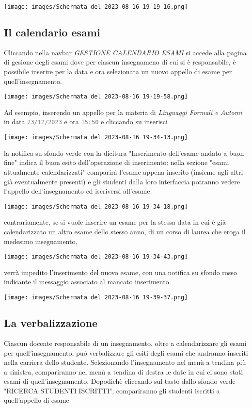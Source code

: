 \documentclass{article}
\newcommand{\attr}[1]{\texttt{\textcolor{gray}{#1}}}
\begin{document}
    \texttt{[image: images/Schermata del 2023-08-16 19-19-16.png]}

    \subsection{Il calendario esami}
    Cliccando nella navbar \textit{GESTIONE CALENDARIO ESAMI} si accede alla pagina di gesione degli esami dove per ciascun insegnameno di cui si è responsabile, è possibile inserire per la data e ora selezionata un nuovo appello di esame per quell'insegnamento.

    \texttt{[image: images/Schermata del 2023-08-16 19-19-58.png]}

    Ad esempio, inserendo un appello per la materia di \textit{Linguaggi Formali e Automi} in data \attr{23/12/2023} e ora \attr{15:50} e cliccando su inserisci

    \texttt{[image: images/Schermata del 2023-08-16 19-34-13.png]}

    la notifica su sfondo verde con la dicitura "Inserimento dell'esame andato a buon fine" indica il buon esito dell'operazione di inserimento: nella sezione "esami attualmente calendarizzati" comparirà l'esame appena inserito (insieme agli altri già eventualmente presenti) e gli studenti dalla loro interfaccia potranno vedere l'appello dell'insegnamento ed iscriversi all'esame.

    \texttt{[image: images/Schermata del 2023-08-16 19-34-18.png]}

    contrariamente, se si vuole inserire un esame per la stessa data in cui è già calendarizzato un altro esame dello stesso anno, di un corso di laurea che eroga il medesimo insegnamento,

    \texttt{[image: images/Schermata del 2023-08-16 19-34-43.png]}

    verrà impedito l'inserimento del nuovo esame, con una notifica su sfondo rosso indicante il messaggio associato al mancato inserimento.

    \texttt{[image: images/Schermata del 2023-08-16 19-39-37.png]}

    \subsection{La verbalizzazione}
    Ciascun docente responsabile di un insegnamento, oltre a calendarizzare gli esami per quell'insegnamento, può verbalizzare gli esiti degli esami che andranno inseriti nella carriera dello studente.
    Selezionando l'insegnamento nel menù a tendina più a sinistra, compariranno nel menù a tendina di destra le date in cui ci sono stati esami di quell'insegnamento. Dopodichè cliccando sul tasto dallo sfondo verde "RICERCA STUDENTI ISCRITTI", compariranno gli studenti iscritti a quell'appello di esame
\end{document}
